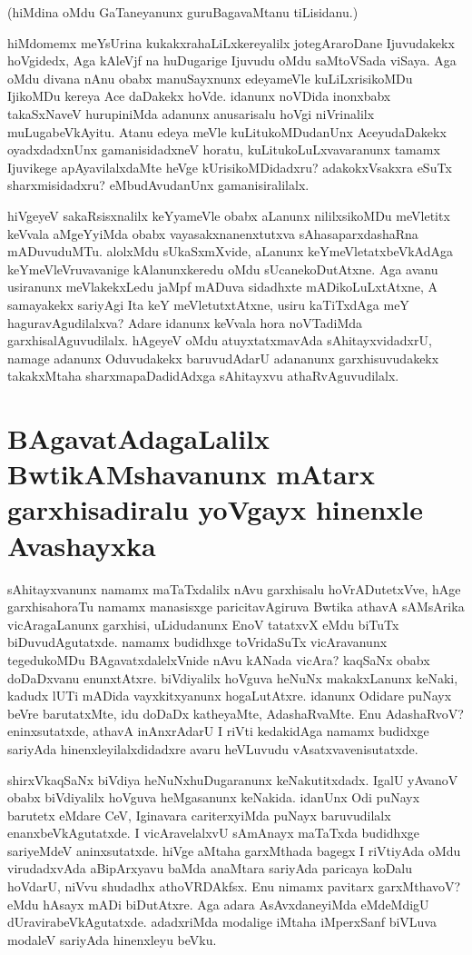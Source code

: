 (hiMdina oMdu GaTaneyanunx guruBagavaMtanu tiLisidanu.)

hiMdomemx meYsUrina kukakxrahaLiLxkereyalilx jotegAraroDane Ijuvudakekx hoVgidedx, Aga kAleVjf na huDugarige Ijuvudu oMdu saMtoVSada viSaya. Aga oMdu divana nAnu obabx manuSayxnunx edeyameVle kuLiLxrisikoMDu IjikoMDu kereya Ace daDakekx hoVde. idanunx noVDida inonxbabx takaSxNaveV hurupiniMda adanunx anusarisalu hoVgi niVrinalilx muLugabeVkAyitu. Atanu edeya meVle kuLitukoMDudanUnx AceyudaDakekx oyadxdadxnUnx gamanisidadxneV horatu, kuLitukoLuLxvavaranunx tamamx Ijuvikege apAyavilalxdaMte heVge kUrisikoMDidadxru? adakokxVsakxra eSuTx sharxmisidadxru? eMbudAvudanUnx gamanisiralilalx. 

hiVgeyeV sakaRsisxnalilx keYyameVle obabx aLanunx nililxsikoMDu meVletitx keVvala aMgeYyiMda obabx vayasakxnanenxtutxva sAhasaparxdashaRna mADuvuduMTu. alolxMdu sUkaSxmXvide, aLanunx keYmeVletatxbeVkAdAga keYmeVleVruvavanige kAlanunxkeredu oMdu sUcanekoDutAtxne. Aga avanu usiranunx meVlakekxLedu jaMpf mADuva sidadhxte mADikoLuLxtAtxne, A samayakekx sariyAgi Ita keY meVletutxtAtxne, usiru kaTiTxdAga meY haguravAgudilalxva? Adare idanunx keVvala hora noVTadiMda garxhisalAguvudilalx. hAgeyeV oMdu atuyxtatxmavAda sAhitayxvidadxrU, namage adanunx Oduvudakekx baruvudAdarU adananunx garxhisuvudakekx takakxMtaha sharxmapaDadidAdxga sAhitayxvu athaRvAguvudilalx. 

\section*{BAgavatAdagaLalilx BwtikAMshavanunx mAtarx garxhisadiralu yoVgayx hinenxle Avashayxka}

sAhitayxvanunx namamx maTaTxdalilx nAvu garxhisalu hoVrADutetxVve, hAge garxhisahoraTu namamx manasisxge paricitavAgiruva Bwtika athavA sAMsArika vicAragaLanunx garxhisi, uLidudanunx EnoV tatatxvX eMdu biTuTx biDuvudAgutatxde. namamx budidhxge toVridaSuTx vicAravanunx tegedukoMDu BAgavatxdalelxVnide nAvu kANada vicAra? kaqSaNx obabx doDaDxvanu enunxtAtxre. biVdiyalilx hoVguva heNuNx makakxLanunx keNaki, kadudx lUTi mADida vayxkitxyanunx hogaLutAtxre. idanunx Odidare puNayx beVre barutatxMte, idu doDaDx katheyaMte, AdashaRvaMte. Enu AdashaRvoV? eninxsutatxde, athavA inAnxrAdarU I riVti kedakidAga namamx budidxge sariyAda hinenxleyilalxdidadxre avaru heVLuvudu vAsatxvavenisutatxde.

shirxVkaqSaNx biVdiya heNuNxhuDugaranunx keNakutitxdadx. IgalU yAvanoV obabx biVdiyalilx hoVguva heMgasanunx keNakida. idanUnx Odi puNayx barutetx eMdare CeV, Iginavara cariterxyiMda puNayx baruvudilalx enanxbeVkAgutatxde. I vicAravelalxvU sAmAnayx maTaTxda budidhxge sariyeMdeV aninxsutatxde. hiVge aMtaha garxMthada bagegx I riVtiyAda oMdu virudadxvAda aBipArxyavu baMda anaMtara sariyAda paricaya koDalu hoVdarU, niVvu shudadhx athoVRDAkfsx. Enu nimamx pavitarx garxMthavoV? eMdu hAsayx mADi biDutAtxre. Aga adara AsAvxdaneyiMda eMdeMdigU dUravirabeVkAgutatxde. adadxriMda modalige iMtaha iMperxSanf biVLuva modaleV sariyAda hinenxleyu beVku.

